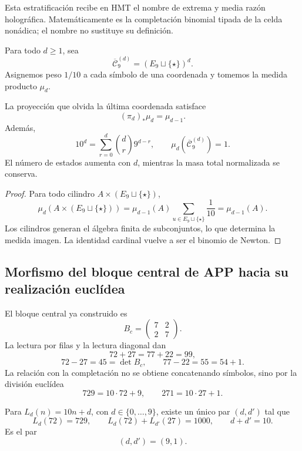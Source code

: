 Esta estratificación recibe en HMT el nombre de extrema y media razón
holográfica. Matemáticamente es la completación binomial tipada de la celda
nonádica; el nombre no sustituye su definición.

Para todo \(d\geq1\), sea
\[
 \overline{\mathcal C}^{(d)}_9=(E_9\sqcup\{\star\})^d.
\]
Asignemos peso \(1/10\) a cada símbolo de una coordenada y tomemos la medida
producto \(\mu_d\).

\begin{theorem}
\label{p12-83-c1-s5:thm:medida-proyectiva-completacion}
La proyección que olvida la última coordenada satisface
\[
 (\pi_d)_*\mu_d=\mu_{d-1}.
\]
Además,
\[
 10^d=\sum_{r=0}^{d}\binom dr9^{d-r},
 \qquad
 \mu_d(\overline{\mathcal C}^{(d)}_9)=1.
\]
El número de estados aumenta con \(d\), mientras la masa total normalizada
se conserva.
\end{theorem}

\begin{proof}
Para todo cilindro \(A\times(E_9\sqcup\{\star\})\),
\[
 \mu_d(A\times(E_9\sqcup\{\star\}))
 =\mu_{d-1}(A)\sum_{u\in E_9\sqcup\{\star\}}\frac1{10}
 =\mu_{d-1}(A).
\]
Los cilindros generan el álgebra finita de subconjuntos, lo que determina la
medida imagen. La identidad cardinal vuelve a ser el binomio de Newton.
\end{proof}

\subsection{Morfismo del bloque central de APP hacia su realización euclídea}

El bloque central ya construido es
\[
 B_c=\begin{pmatrix}7&2\\2&7\end{pmatrix}.
\]
La lectura por filas y la lectura diagonal dan
\[
 72+27=77+22=99,
\]
\[
 72-27=45=\det B_c,
 \qquad
 77-22=55=54+1.
\]
La relación con la completación no se obtiene concatenando símbolos, sino
por la división euclídea
\[
 729=10\cdot72+9,
 \qquad
 271=10\cdot27+1.
\]

\begin{theorem}
\label{p12-83-c1-s5:thm:levantamiento-decimal-emrh-autonomo}
Para \(L_d(n)=10n+d\), con \(d\in\{0,\ldots,9\}\), existe un único par
\((d,d')\) tal que
\[
 L_d(72)=729,
 \qquad
 L_d(72)+L_{d'}(27)=1000,
 \qquad
 d+d'=10.
\]
Es el par
\[
 (d,d')=(9,1).
\]
\end{theorem}

